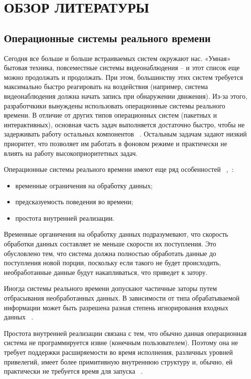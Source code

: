 \section{ОБЗОР ЛИТЕРАТУРЫ}
\label{sec:domain}

\subsection{Операционные системы реального времени}

Сегодня все больше и больше встраиваемых систем окружают нас. «Умная» бытовая
техника, повсеместные системы видеонаблюдения -- и этот список еще можно
продолжать и продолжать. При этом, большинству этих систем требуется максимально
быстро реагировать на воздействия (например, система видеонаблюдения должна начать
запись при обнаружении движения).
Из-за этого, разработчкики вынуждены использовать операционные системы
реального времени. В отличие от других типов операционных систем (пакетных и
интерактивных), основная часть задач выполняется достаточно быстро, чтобы
не задерживать работу остальных компонентов ~\cite{tanenbaum_modern_os_2015_ru}.
Остальным задачам задают низкий приоритет, что позволяет им работать в фоновом
режиме и практически не влиять на работу высокоприоритетных задач.

Операционные системы реального времени имеют еще ряд особенностей
~\cite{tanenbaum_modern_os_2015_ru},~\cite{rtos_valvano}:
\begin{itemize}
    \item временные ограничения на обработку данных;
    \item предсказуемость поведения во времени;
    \item простота внутренней реализации.
\end{itemize}

Временные органичения на обработку данных подразумевают, что скорость обработки
данных составляет не меньше скорости их поступления. Это обусловлено тем, что
система должна полностью обработать данные до поступления новой порции, поскольку
если такого не будет происходить, необработанные данные будут накапливаться,
что приведет к затору.

Иногда системы реального времени допускают частичные заторы путем отбрасывания
необработанных данных. В зависимости от типа обрабатываемой информации
может быть разрешена разная степень игнорирования входных данных
~\cite{tanenbaum_modern_os_2015_ru}.

Простота внутренней реализации связана с тем, что обычно данная
операционная система не программируется извне (конечным пользователем).
Поэтому она не требует поддержки расширяемости во время исполнения,
различных уровней привелегий, имеет более примитивную внутреннюю структуру
и, обычно, ей практически не требуется время для запуска ~\cite{rtos_valvano}.

